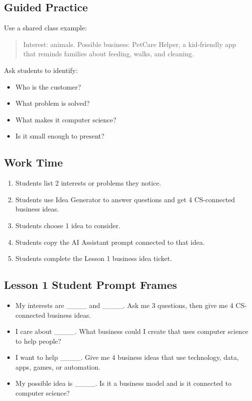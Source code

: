 \documentclass[11pt]{article}
\begin{document}
\subsection{Guided Practice}
Use a shared class example:
\begin{quote}
Interest: animals. Possible business: PetCare Helper, a kid-friendly app that reminds families about feeding, walks, and cleaning.
\end{quote}
Ask students to identify:
\begin{itemize}
  \item Who is the customer?
  \item What problem is solved?
  \item What makes it computer science?
  \item Is it small enough to present?
\end{itemize}

\subsection{Work Time}
\begin{enumerate}
  \item Students list 2 interests or problems they notice.
  \item Students use Idea Generator to answer questions and get 4 CS-connected business ideas.
  \item Students choose 1 idea to consider.
  \item Students copy the AI Assistant prompt connected to that idea.
  \item Students complete the Lesson 1 business idea ticket.
\end{enumerate}

\subsection{Lesson 1 Student Prompt Frames}
\begin{itemize}
  \item My interests are \_\_\_\_ and \_\_\_\_. Ask me 3 questions, then give me 4 CS-connected business ideas.
  \item I care about \_\_\_\_. What business could I create that uses computer science to help people?
  \item I want to help \_\_\_\_. Give me 4 business ideas that use technology, data, apps, games, or automation.
  \item My possible idea is \_\_\_\_. Is it a business model and is it connected to computer science?
\end{itemize}
\end{document}
